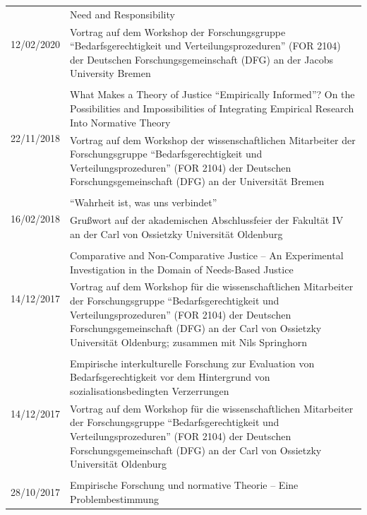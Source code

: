 \documentclass[a4paper,10pt]{article}
\begin{document}
\begin{longtable}{p{2.5cm}p{11cm}}
\multirow{2}{2.5cm}{\footnotesize{12/02/2020}} & Need and Responsibility\\
& \footnotesize{Vortrag auf dem Workshop der Forschungsgruppe \enquote{Bedarfsgerechtigkeit und Verteilungsprozeduren} (FOR 2104) der Deutschen Forschungsgemeinschaft (DFG) an der Jacobs University Bremen}\\
\\
\multirow{2}{2.5cm}{\footnotesize{22/11/2018}} & What Makes a Theory of Justice \enquote{Empirically Informed}? On the Possibilities and Impossibilities of Integrating Empirical Research Into Normative Theory\\
& \footnotesize{Vortrag auf dem Workshop der wissenschaftlichen Mitarbeiter der Forschungsgruppe \enquote{Bedarfsgerechtigkeit und Verteilungsprozeduren} (FOR 2104) der Deutschen Forschungsgemeinschaft (DFG) an der Universität Bremen}\\
\\
\multirow{2}{2.5cm}{\footnotesize{16/02/2018}} & \enquote{Wahrheit ist, was uns verbindet}\\
& \footnotesize{Grußwort auf der akademischen Abschlussfeier der Fakultät IV an der Carl von Ossietzky Universität Oldenburg}\\
\\
\multirow{2}{2.5cm}{\footnotesize{14/12/2017}} & Comparative and Non-Comparative Justice -- An Experimental Investigation in the Domain of Needs-Based Justice\\
& \footnotesize{Vortrag auf dem Workshop für die wissenschaftlichen Mitarbeiter der Forschungsgruppe \enquote{Bedarfsgerechtigkeit und Verteilungsprozeduren} (FOR 2104) der Deutschen Forschungsgemeinschaft (DFG) an der Carl von Ossietzky Universität Oldenburg; zusammen mit Nils Springhorn}\\
\\
\multirow{2}{2.5cm}{\footnotesize{14/12/2017}} & Empirische interkulturelle Forschung zur Evaluation von Bedarfsgerechtigkeit vor dem Hintergrund von sozialisationsbedingten Verzerrungen\\
& \footnotesize{Vortrag auf dem Workshop für die wissenschaftlichen Mitarbeiter der Forschungsgruppe \enquote{Bedarfsgerechtigkeit und Verteilungsprozeduren} (FOR 2104) der Deutschen Forschungsgemeinschaft (DFG) an der Carl von Ossietzky Universität Oldenburg}\\
\\
\multirow{2}{2.5cm}{\footnotesize{28/10/2017}} & Empirische Forschung und normative Theorie -- Eine Problembestimmung\\

\end{longtable}
\end{document}
